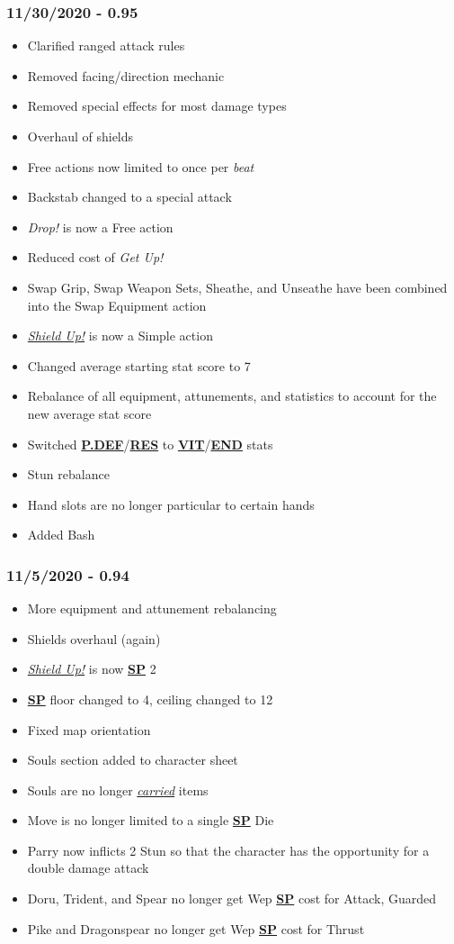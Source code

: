 \documentclass[12pt]{article}
\newcommand{\refto}[1]{\hyperlink{#1}{\textbf{#1}}}
\newcommand{\reftoit}[1]{\hyperlink{#1}{\emph{#1}}}
\begin{document}
\begin{multicols*}{2}
\subsubsection*{11/30/2020 - 0.95}
\begin{itemize}
\item Clarified ranged attack rules
\item Removed facing/direction mechanic
\item Removed special effects for most damage types
\item Overhaul of shields
\item Free actions now limited to once per \emph{beat}
\item Backstab changed to a special attack
\item \emph{Drop!} is now a Free action
\item Reduced cost of \emph{Get Up!}
\item Swap Grip, Swap Weapon Sets, Sheathe, and Unseathe have been combined into the Swap Equipment action
\item \reftoit{Shield Up!} is now a Simple action
\item Changed average starting stat score to 7
\item Rebalance of all equipment, attunements, and statistics to account for the new average stat score
\item Switched \refto{P.DEF}/\refto{RES} to \refto{VIT}/\refto{END} stats
\item Stun rebalance
\item Hand slots are no longer particular to certain hands
\item Added Bash
\end{itemize}
\subsubsection*{11/5/2020 - 0.94}
\begin{itemize}
\item More equipment and attunement rebalancing
\item Shields overhaul (again)
\item \reftoit{Shield Up!} is now \refto{SP} 2
\item \refto{SP} floor changed to 4, ceiling changed to 12
\item Fixed map orientation
\item Souls section added to character sheet
\item Souls are no longer \reftoit{carried} items
\item Move is no longer limited to a single \refto{SP} Die
\item Parry now inflicts 2 Stun so that the character has the opportunity for a double damage attack
\item Doru, Trident, and Spear no longer get Wep \refto{SP} cost for Attack, Guarded
\item Pike and Dragonspear no longer get Wep \refto{SP} cost for Thrust
\end{itemize}

\end{multicols*}
\end{document}
